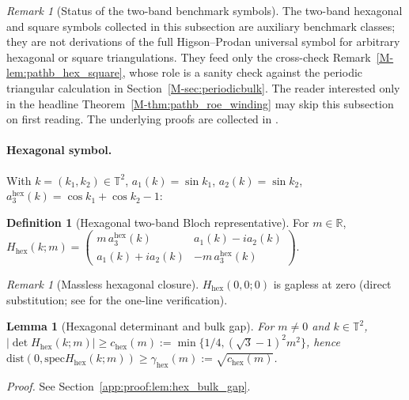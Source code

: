 \documentclass[11pt]{article}
\numberwithin{equation}{section}
\newtheorem{lemma}[theorem]{Lemma}
\theoremstyle{definition}
\newtheorem{definition}[theorem]{Definition}
\theoremstyle{remark}
\newtheorem{remark}[theorem]{Remark}
\newcommand{\proofref}[1]{%
  \par\noindent\emph{Proof.} See Section~\ref{#1}.\par\medskip
}
\newcommand{\proofappendixref}[1]{\proofref{#1}}
\newcommand{\spec}{\mathrm{spec}}
\newcommand{\dist}{\mathrm{dist}}
\newcommand{\hexagon}{\mathrm{hex}}
\begin{document}
\begin{remark}[Status of the two-band benchmark symbols]\label{rem:two_band_benchmarks}
The two-band hexagonal and square symbols collected in this subsection are auxiliary benchmark
classes; they are not derivations of the full Higson--Prodan universal symbol for arbitrary
hexagonal or square triangulations. They feed only the cross-check
Remark~\ref{M-lem:pathb_hex_square}, whose role is a sanity check against the periodic triangular
calculation in Section~\ref{M-sec:periodicbulk}. The reader interested only in the headline
Theorem~\ref{M-thm:pathb_roe_winding} may skip this subsection on first reading. The underlying
proofs are collected in
.
\end{remark}

\paragraph{Hexagonal symbol.}
With \(k=(k_1,k_2)\in\mathbb T^2\), \(a_1(k)=\sin k_1\), \(a_2(k)=\sin k_2\),
\(a_3^{\hexagon}(k)=\cos k_1+\cos k_2-1\):

\begin{definition}[Hexagonal two-band Bloch representative]\label{def:hex_bloch_symbol}
For \(m\in\mathbb R\),
\(H_{\hexagon}(k;m)=
\begin{pmatrix} m\,a_3^{\hexagon}(k) & a_1(k)-i a_2(k)\\ a_1(k)+i a_2(k) & -m\,a_3^{\hexagon}(k)\end{pmatrix}\).
\end{definition}

\begin{remark}[Massless hexagonal closure]\label{lem:hex_massless_closure}
\(H_{\hexagon}(0,0;0)\) is gapless at zero (direct substitution; see
 for the one-line verification).
\end{remark}

\begin{lemma}[Hexagonal determinant and bulk gap]\label{lem:hex_bulk_gap}
For \(m\ne0\) and \(k\in\mathbb T^2\),
\(|\det H_{\hexagon}(k;m)|\ge c_{\hexagon}(m):=\min\{1/4,(\sqrt{3}-1)^2m^2\}\), hence
\(\dist(0,\spec H_{\hexagon}(k;m))\ge \gamma_{\hexagon}(m):=\sqrt{c_{\hexagon}(m)}\).
\end{lemma}
\proofappendixref{app:proof:lem:hex_bulk_gap}
\end{document}
